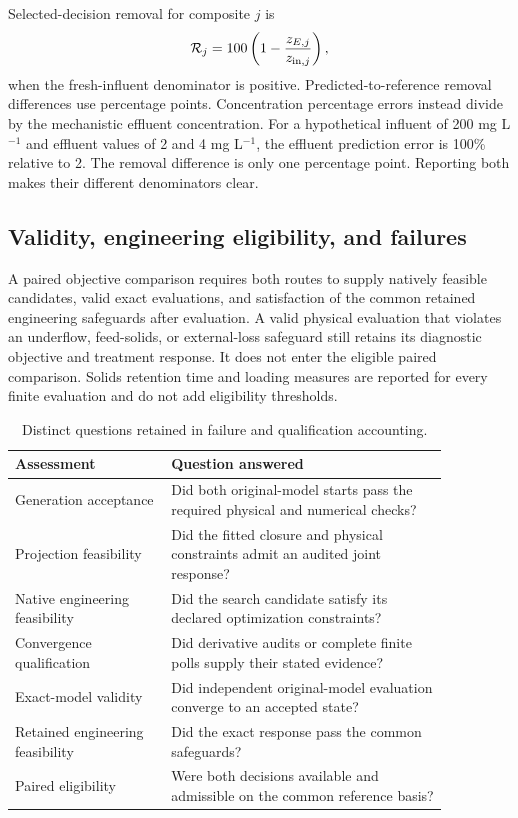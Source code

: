 Selected-decision removal for composite $j$ is
\begin{equation}
\mathcal R_j=100\left(1-\frac{z_{E,j}}{z_{{\rm in},j}}\right),
\end{equation}
when the fresh-influent denominator is positive. Predicted-to-reference removal differences use percentage points. Concentration percentage errors instead divide by the mechanistic effluent concentration. For a hypothetical influent of 200 mg L$^{-1}$ and effluent values of 2 and 4 mg L$^{-1}$, the effluent prediction error is 100\% relative to 2. The removal difference is only one percentage point. Reporting both makes their different denominators clear.

\subsection{Validity, engineering eligibility, and failures}

A paired objective comparison requires both routes to supply natively feasible candidates, valid exact evaluations, and satisfaction of the common retained engineering safeguards after evaluation. A valid physical evaluation that violates an underflow, feed-solids, or external-loss safeguard still retains its diagnostic objective and treatment response. It does not enter the eligible paired comparison. Solids retention time and loading measures are reported for every finite evaluation and do not add eligibility thresholds.

\begin{table}[htbp]
\centering\small
\caption{Distinct questions retained in failure and qualification accounting.}
\label{tab:plant_failure_classes}
\begin{tabular}{p{0.31\linewidth}p{0.55\linewidth}}
\toprule Assessment & Question answered\\\midrule
Generation acceptance & Did both original-model starts pass the required physical and numerical checks?\\
Projection feasibility & Did the fitted closure and physical constraints admit an audited joint response?\\
Native engineering feasibility & Did the search candidate satisfy its declared optimization constraints?\\
Convergence qualification & Did derivative audits or complete finite polls supply their stated evidence?\\
Exact-model validity & Did independent original-model evaluation converge to an accepted state?\\
Retained engineering feasibility & Did the exact response pass the common safeguards?\\
Paired eligibility & Were both decisions available and admissible on the common reference basis?\\
\bottomrule
\end{tabular}
\end{table}

